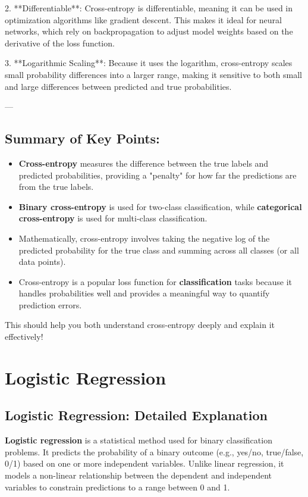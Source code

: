 \documentclass[12pt]{book}
\begin{document}
2. **Differentiable**:  
   Cross-entropy is differentiable, meaning it can be used in optimization algorithms like gradient descent. This makes it ideal for neural networks, which rely on backpropagation to adjust model weights based on the derivative of the loss function.

3. **Logarithmic Scaling**:  
   Because it uses the logarithm, cross-entropy scales small probability differences into a larger range, making it sensitive to both small and large differences between predicted and true probabilities.

---

\section{Summary of Key Points:}

\begin{itemize}
    \item [-] \textbf{Cross-entropy} measures the difference between the true labels and predicted probabilities, providing a "penalty" for how far the predictions are from the true labels.
    \item [-] \textbf{Binary cross-entropy} is used for two-class classification, while \textbf{categorical cross-entropy} is used for multi-class classification.
    \item [-] Mathematically, cross-entropy involves taking the negative log of the predicted probability for the true class and summing across all classes (or all data points).
    \item [-] Cross-entropy is a popular loss function for \textbf{classification} tasks because it handles probabilities well and provides a meaningful way to quantify prediction errors.
\end{itemize}

This should help you both understand cross-entropy deeply and explain it effectively!

\chapter{Logistic Regression}

\section{Logistic Regression: Detailed
Explanation}\label{logistic-regression-detailed-explanation}

\textbf{Logistic regression} is a statistical method used for binary
classification problems. It predicts the probability of a binary outcome
(e.g., yes/no, true/false, 0/1) based on one or more independent
variables. Unlike linear regression, it models a non-linear relationship
between the dependent and independent variables to constrain predictions
to a range between 0 and 1.
\end{document}
